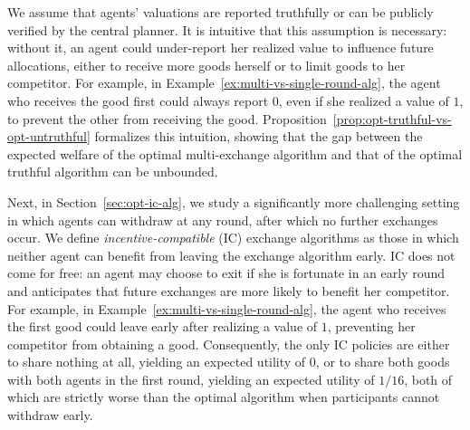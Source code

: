 We assume that agents' valuations are reported truthfully or can be publicly verified by the central planner. 
It is intuitive that this assumption is necessary: without it, an agent could under-report her realized value to influence future allocations, 
either to receive more goods herself or to limit goods to her competitor. For example, in Example~\ref{ex:multi-vs-single-round-alg}, 
the agent who receives the good first could always report $0$, even if she realized a value of $1$, to prevent the other from receiving the good. 
Proposition~\ref{prop:opt-truthful-vs-opt-untruthful} formalizes this intuition, showing that the gap between the expected welfare of the optimal 
multi-exchange algorithm and that of the optimal truthful algorithm can be unbounded.






Next, in Section~\ref{sec:opt-ic-alg}, we study a significantly more challenging setting in which agents can withdraw at any round, after which no further exchanges occur. We define \emph{incentive-compatible} (IC) exchange algorithms as those in which neither agent can benefit from leaving the exchange algorithm early.
IC does not come for free: an agent may choose to exit if she is fortunate in an early round and anticipates that future exchanges are more 
likely to benefit her competitor. For example, in Example~\ref{ex:multi-vs-single-round-alg}, the agent who receives the first good 
could leave early after realizing a value of $1$, preventing her competitor from obtaining a good. Consequently, the only IC policies 
are either to share nothing at all, yielding an expected utility of $0$, or to share both goods with both agents in the first round, yielding 
an expected utility of $1/16$, both of which are strictly worse than the optimal algorithm when participants cannot withdraw early.


